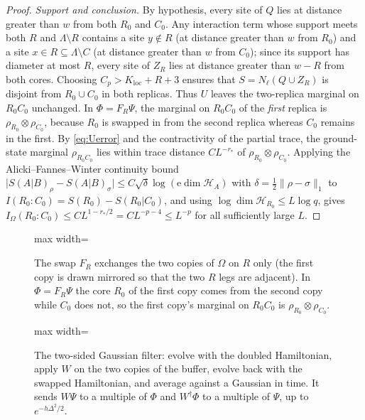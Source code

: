 \documentclass[aps,prx,reprint,superscriptaddress,floatfix,nofootinbib,longbibliography,amsmath,amssymb]{revtex4-2}
\newcommand{\norm}[1]{\lVert #1\rVert}
\newcommand{\abs}[1]{\lvert #1\rvert}
\newcommand{\cH}{\mathcal H}
\newcommand{\Om}{\Omega}
\newcommand{\Lam}{\Lambda}
\newcommand{\e}{\mathrm e}
\theoremstyle{plain}
\theoremstyle{definition}
\begin{document}
\begin{proof}
\emph{Support and conclusion.} By hypothesis, every site of $Q$ lies at distance greater than $w$ from
both $R_0$ and $C_0$. Any interaction term whose support meets both $R$ and $\Lam\setminus R$
contains a site $y\notin R$ (at distance greater than $w$ from $R_0$) and a site
$x\in R\subseteq\Lam\setminus C$ (at distance greater than $w$ from $C_0$); since its support
has diameter at most $R$, every site of $Z_R$ lies at distance greater than $w-R$ from
both cores. Choosing $C_p>K_{\mathrm{loc}}+R+3$ ensures that $S=N_\ell(Q\cup Z_R)$ is
disjoint from $R_0\cup C_0$ in both replicas. Thus $U$ leaves the
two-replica marginal on $R_0C_0$ unchanged. In $\Phi=F_R\Psi$, the marginal on
$R_0C_0$ of the \emph{first} replica is $\rho_{R_0}\otimes\rho_{C_0}$,
because $R_0$ is swapped in from the second replica whereas $C_0$ remains in the first. By
\eqref{eq:Uerror} and the contractivity of the partial trace, the ground-state
marginal $\rho_{R_0C_0}$ lies within trace distance $CL^{-r_*}$ of
$\rho_{R_0}\otimes\rho_{C_0}$. Applying the Alicki--Fannes--Winter continuity bound
$\abs{S(A|B)_\rho-S(A|B)_\sigma}\le C\sqrt\delta\log(\e\dim\cH_A)$ with
$\delta=\frac12\norm{\rho-\sigma}_1$ \cite{Winter2016} to
$I(R_0:C_0)=S(R_0)-S(R_0|C_0)$, and using $\log\dim\cH_{R_0}\le L\log q$, gives
$I_\Om(R_0:C_0)\le CL^{1-r_*/2}=CL^{-p-4}\le L^{-p}$ for all sufficiently large $L$.
\end{proof}

\begin{figure}[t]
\centering
\begin{adjustbox}{max width=\linewidth}

\end{adjustbox}
\caption{The swap $F_R$ exchanges the two copies of $\Omega$ on $R$ only (the first copy is drawn mirrored so that the two $R$ legs are adjacent). In $\Phi=F_R\Psi$ the core $R_0$ of the first copy comes from the second copy while $C_0$ does not, so the first copy's marginal on $R_0C_0$ is $\rho_{R_0}\otimes\rho_{C_0}$.}\label{fig:replica-swap}
\end{figure}

\begin{figure}[t]
\centering
\begin{adjustbox}{max width=\linewidth}

\end{adjustbox}
\caption{The two-sided Gaussian filter: evolve with the doubled Hamiltonian, apply $W$ on the two copies of the buffer, evolve back with the swapped Hamiltonian, and average against a Gaussian in time. It sends $W\Psi$ to a multiple of $\Phi$ and $W^\dagger\Phi$ to a multiple of $\Psi$, up to $e^{-h\Delta^2/2}$.}\label{fig:qc-gaussian-filter}
\end{figure}
\end{document}
